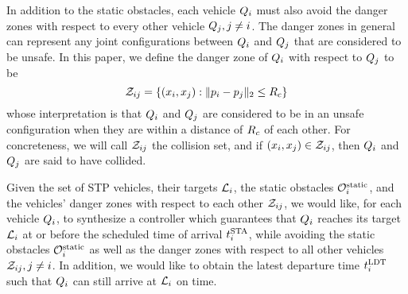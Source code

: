 In addition to the static obstacles, each vehicle $Q_i$ must also avoid the danger zones with respect to every other vehicle $Q_j, j\neq i$. The danger zones in general can represent any joint configurations between $Q_i$ and $Q_j$ that are considered to be unsafe. In this paper, we define the danger zone of $Q_i$ with respect to $Q_j$ to be
%
\begin{equation}
\mathcal{Z}_{ij} = \{(x_i, x_j): \|p_i - p_j\|_2 \le R_c\}
\end{equation}
%
\noindent whose interpretation is that $Q_i$ and $Q_j$ are considered to be in an unsafe configuration when they are within a distance of $R_c$ of each other. For concreteness, we will call $\mathcal{Z}_{ij}$ the collision set, and if $(x_i, x_j) \in \mathcal{Z}_{ij}$, then $Q_i$ and $Q_j$ are said to have collided.  

Given the set of STP vehicles, their targets $\mathcal{L}_i$, the static obstacles $\mathcal{O}^\text{static}_i$, and the vehicles' danger zones with respect to each other $\mathcal{Z}_{ij}$, we would like, for each vehicle $Q_i$, to synthesize a controller which guarantees that $Q_i$ reaches its target $\mathcal{L}_i$ at or before the scheduled time of arrival $t^\text{STA}_i$, while avoiding the static obstacles $\mathcal{O}^\text{static}_i$ as well as the danger zones with respect to all other vehicles $\mathcal{Z}_{ij}, j\neq i$. In addition, we would like to obtain the latest departure time $t^\text{LDT}_i$ such that $Q_i$ can still arrive at $\mathcal{L}_i$ on time. 

